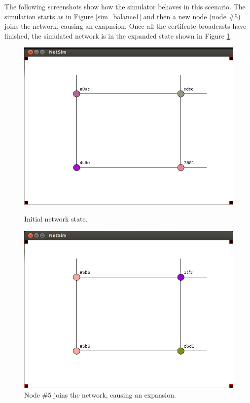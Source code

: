 \documentclass[ %
                    author={Luke Murray},
                supervisor={Dr. Simon Hollis},
                     title={Shadow Peer-to-Peer Networks},
                  subtitle={},
                    degree={MEng},
                      year={2013} ]{thesis}
\begin{document}
The following screenshots show how the simulator behaves in this scenario. The simulation starts as in Figure \ref{sim_balance1} and then a new node (node \#5) joins the network, causing an exapnsion. Once all the certifcate broadcasts have finished, the simulated network is in the expanded state shown in Figure \ref{sim_balance2}.

\begin{figure}[h]
    \centering
    \begin{minipage}[b]{0.45\linewidth}
        \centering
        \includegraphics[width=\linewidth]{sim_pics/balance_1.png}
        \caption{Initial network state.}
        \label{sim_balance1}
    \end{minipage}
    \hspace{0.5cm}
    \begin{minipage}[b]{0.45\linewidth}
        \centering
        \includegraphics[width=\linewidth]{sim_pics/expand_4.png}
        \caption{Node \#5 joins the network, causing an expansion.}
        \label{sim_balance2}
    \end{minipage}
\end{figure}
\end{document}

